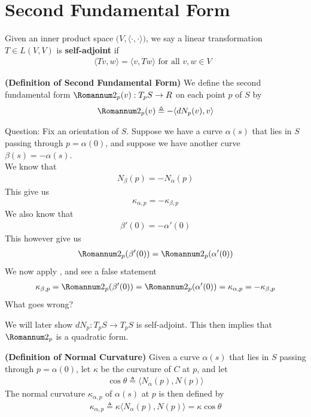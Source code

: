 \documentclass{report}
\begin{document}
\section{Second Fundamental Form}
\begin{mdframed}
  Given an inner product space $\Big(V, \langle \cdot,\cdot\rangle  \Big)$, we say a linear transformation $T\in L(V,V)$ is \textbf{self-adjoint} if 
\begin{align*}
\langle Tv,w\rangle = \langle v,Tw\rangle \text{ for all $v,w\in V$ }
\end{align*}
\end{mdframed}
\begin{definition}
  \textbf{(Definition of Second Fundamental Form)} We define the second fundamental form $\Sec_p(v):T_pS\rightarrow R$ on each point $p$ of $S$ by  
\begin{align*}
\Sec _p(v)\triangleq - \langle dN_p(v),v\rangle 
\end{align*}
\end{definition}
\begin{mdframed}
Question: Fix an orientation of $S$. Suppose we have a curve $\alpha (s)$ that lies in $S$ passing through $p=\alpha (0)$, and suppose we have another curve $\beta (s)=- \alpha (s)$.\\

We know that 
\begin{align*}
N_{\beta }(p)=-N_\alpha (p)
\end{align*}
This give us 
\begin{align*}
\kappa_{\alpha ,p}=-\kappa_{\beta ,p}
\end{align*}
We also know that 
\begin{align*}
\beta '(0)=-\alpha '(0)
\end{align*}
This however give us 
\begin{align*}
\Sec_p(\beta '(0))=\Sec_p(\alpha '(0))
\end{align*}
We now apply , and see a false statement
\begin{align*}
\kappa_{\beta ,p}=\Sec_p(\beta '(0))=\Sec_p(\alpha '(0))=\kappa_{\alpha ,p}=-\kappa_{\beta ,p}
\end{align*}
What goes wrong? 
\end{mdframed}
\begin{mdframed}
We will later show $dN_p:T_pS\rightarrow T_pS$ is self-adjoint. This then implies that $\Sec_p$ is a quadratic form.
\end{mdframed}
\begin{definition}
\textbf{(Definition of Normal Curvature)} Given a curve $\alpha (s)$ that lies in $S$ passing through $p=\alpha (0)$, let $\kappa$ be the curvature of $C$ at $p$, and let  
\begin{align*}
\cos \theta \triangleq \langle N_\alpha (p),N(p)\rangle 
\end{align*}
The normal curvature $\kappa_{\alpha ,p}$ of $\alpha (s)$ at $p$ is then defined by 
\begin{align*}
\kappa_{\alpha ,p} \triangleq  \kappa \langle N_\alpha (p),N(p)\rangle = \kappa \cos \theta
\end{align*}
\end{definition}
\end{document}
